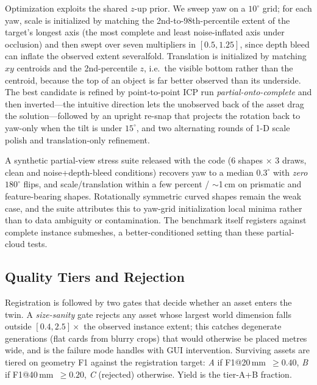 Optimization exploits the shared $z$-up prior.
We sweep yaw on a $10^\circ$ grid; for each yaw, scale is initialized by
matching the 2nd-to-98th-percentile extent of the target's longest axis
(the most complete and least noise-inflated axis under occlusion) and then
swept over seven multipliers in $[0.5,1.25]$, since depth bleed can
inflate the observed extent severalfold. Translation is initialized by
matching $xy$ centroids and the 2nd-percentile $z$, i.e.\ the visible
bottom rather than the centroid, because the top of an object is far
better observed than its underside. The best candidate is refined by
point-to-point ICP run \emph{partial-onto-complete} and then inverted---the
intuitive direction lets the unobserved back of the asset drag the
solution---followed by an upright re-snap that projects the rotation back
to yaw-only when the tilt is under $15^\circ$, and two alternating rounds
of 1-D scale polish and translation-only refinement.

A synthetic partial-view stress suite released with the code (6 shapes
$\times$ 3 draws, clean and noise+depth-bleed conditions) recovers yaw to
a median $0.3^\circ$ with \emph{zero} $180^\circ$ flips, and
scale/translation within a few percent / $\sim$1\,cm on prismatic and
feature-bearing shapes. Rotationally symmetric curved shapes remain the
weak case, and the suite attributes this to yaw-grid initialization local
minima rather than to data ambiguity or contamination. The benchmark itself
registers against complete instance submeshes, a better-conditioned
setting than these partial-cloud tests.

\subsection{Quality Tiers and Rejection}
\label{sec:tiers}
Registration is followed by two gates that decide whether an asset enters
the twin. A \emph{size-sanity} gate rejects any asset whose largest world
dimension falls outside $[0.4,2.5]\times$ the observed instance extent;
this catches degenerate generations (flat cards from blurry crops) that
would otherwise be placed metres wide, and is the failure mode
\cite{simfoundry} handles with GUI intervention. Surviving assets are
tiered on geometry F1 against the registration target:
\emph{A} if F1@20\,mm~$\geq0.40$, \emph{B} if F1@40\,mm~$\geq0.20$,
\emph{C} (rejected) otherwise. Yield is the tier-A+B fraction.

